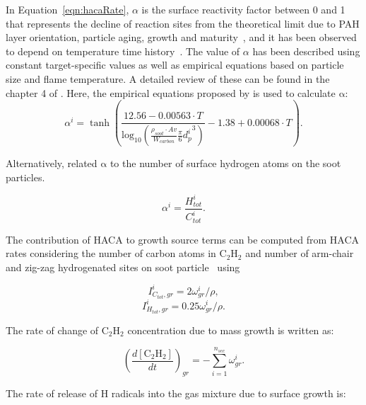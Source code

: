 In Equation~\eqref{eqn:hacaRate}, $\alpha$ is the surface reactivity factor between 0 and 1 that represents the decline of reaction sites from the theoretical limit due to PAH layer orientation, particle aging, growth and maturity~\citep{haynes1982surface, harris1985chemical}, and it has been observed to depend on temperature time history~\cite{homann1985formation, dasch1985decay}. The value of $\alpha$ has been described using constant target-specific values as well as empirical equations based on particle size and flame temperature. A detailed review of these can be found in the chapter 4 of \citep{veshkini2015understanding}.  Here, the empirical equations proposed by \citet{appel2000kinetic} is used to calculate $\mathrm{\alpha}$:
\begin{equation}
	\alpha^i = \tanh 
	\left(
	\frac{12.56 - 0.00563\cdot T}
	{\mbox{log}_{10}
		\left( \frac{\rho_{soot}\cdot Av}{W_{carbon}} \frac{\pi}{6}{d^i_p}^3 \right) } -1.38+0.00068\cdot T
	\right)
	\label{eqn:alpha}.
\end{equation}

 Alternatively, \citet{blanquart2009joint} related $\mathrm{\alpha}$ to the number of surface hydrogen atoms on the soot particles.

\begin{equation}
	\alpha^i = \frac{H^i_{tot}}{C^i_{tot}}
	\label{eqn:alpha_htoc}.
\end{equation}

The contribution of HACA to growth source terms can be computed from HACA rates considering the number of carbon atoms in $\mathrm{C_2H_2}$ and number of arm-chair and zig-zag hydrogenated sites on soot particle~\cite{blanquart2009analyzing} using

\begin{equation}
	I^i_{C_{tot},gr} = 2\omega^i_{gr}/\rho
	\label{eqn:IiCtotgr},
\end{equation}
\begin{equation}
	I^i_{H_{tot},gr} = 0.25\omega^i_{gr}/\rho
	\label{eqn:IiHtotgr}.
\end{equation}

The rate of change of $\mathrm{C_2H_2}$ concentration due to mass growth is written as:

\begin{equation}
	\left(\frac{d\left[{\mathrm{C_2H_2}}\right]}{dt}\right)_{gr} = -\sum_{i=1}^{n_{sec}}\omega^i_{gr}
	\label{eqn:C2H2rate_gr}.
\end{equation}

The rate of release of H radicals into the gas mixture due to surface growth is:

